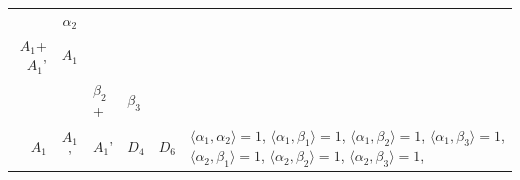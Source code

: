 \documentclass[12pt]{report}
\begin{document}
\begin{appendix}
{\begin{longtable}{rcl p{1cm}p{1cm}p{3cm} }
\begin{tabular}{cc}$\alpha_1$+ & $\alpha_2$\\\tiny{ $A_1$+$A_1$' } & \tiny{ $A_1$ }\end{tabular} &\begin{tabular}{c} = \\~ \end{tabular} & \begin{tabular}{ccc}$\beta_1$+ & $\beta_2$+ & $\beta_3$\\\tiny{ $A_1$ } & \tiny{ $A_1$' } & \tiny{ $A_1$' }\end{tabular} & $D_4$ & $D_6$ & $\langle\alpha_1, \alpha_2\rangle=1$,  $\langle\alpha_1, \beta_1\rangle=1$, $\langle\alpha_1, \beta_2\rangle=1$, $\langle\alpha_1, \beta_3\rangle=1$, $\langle\alpha_2, \beta_1\rangle=1$, $\langle\alpha_2, \beta_2\rangle=1$, $\langle\alpha_2, \beta_3\rangle=1$, 
\\
\end{longtable}

}
\end{appendix}
\end{document}
